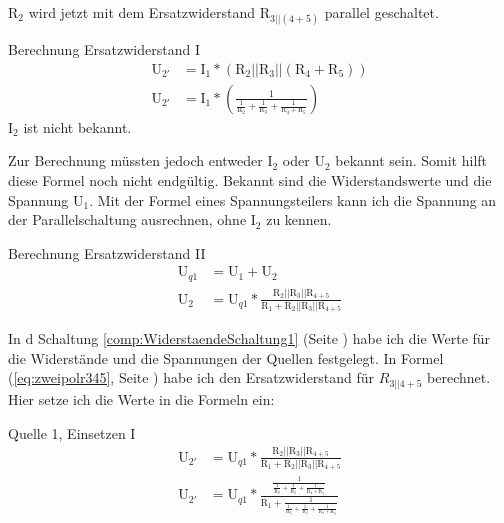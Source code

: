 $\text{R}_2$ wird jetzt mit dem Ersatzwiderstand $\text{R}_{3||(4+5)}$ parallel geschaltet.
\begin{frame}{Berechnung Ersatzwiderstand I}
  \begin{align}
    \text{U}_{2'} &= \text{I}_1 * (\text{R}_2||\text{R}_3||(\text{R}_4+\text{R}_5))\\
    \text{U}_{2'} &= \text{I}_1 *\left(\frac{1}{\frac{1}{\text{R}_2}+\frac{1}{\text{R}_3}+\frac{1}{\text{R}_4+\text{R}_5}}\right )
  \end{align}
  $\text{I}_2$ ist nicht bekannt.
\end{frame}
Zur Berechnung müssten jedoch entweder $\text{I}_2$ oder $\text{U}_2$ bekannt sein. Somit hilft diese Formel noch nicht endgültig. Bekannt sind die Widerstandswerte und die Spannung $\text{U}_1$. Mit der Formel eines Spannungsteilers kann ich die Spannung an der Parallelschaltung ausrechnen, ohne $\text{I}_2$ zu kennen.
\begin{frame}{Berechnung Ersatzwiderstand II}
  \begin{align}
    \text{U}_{q1} &= \text{U}_1 + \text{U}_2\\
    \text{U}_2 &= \text{U}_{q1}*\frac{\text{R}_2||\text{R}_3||\text{R}_{4+5}}{\text{R}_1+ \text{R}_2||\text{R}_3||\text{R}_{4+5}}
  \end{align}
\end{frame}
In d Schaltung \ref{comp:WiderstaendeSchaltung1} (Seite \pageref{comp:WiderstaendeSchaltung1}) habe ich die Werte für die Widerstände und die Spannungen der Quellen festgelegt. In Formel (\ref{eq:zweipolr345}, Seite \pageref{eq:zweipolr345}) habe ich den Ersatzwiderstand für $R_{3||4+5}$ berechnet. Hier setze ich die Werte in die Formeln ein:
\begin{frame}{Quelle 1, Einsetzen I}
  \begin{align}
    \text{U}_{2'} &= \text{U}_{q1}*\frac{\text{R}_2||\text{R}_3||\text{R}_{4+5}}{\text{R}_1 + \text{R}_2||\text{R}_3||\text{R}_{4+5}}\\
    \text{U}_{2'} &= \text{U}_{q1}*\frac{\frac{1}{\frac{1}{\text{R}_2}+\frac{1}{\text{R}_3}+\frac{1}{\text{R}_4+\text{R}_5}}}{\text{R}_1 + \frac{1}{\frac{1}{\text{R}_2}+\frac{1}{\text{R}_3}+\frac{1}{\text{R}_4+\text{R}_5}}}\\
  \end{align}
\end{frame}
